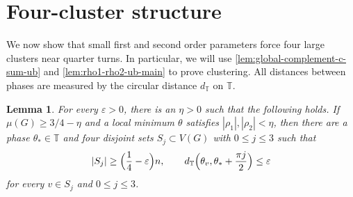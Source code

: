 \documentclass[reqno,11pt]{amsart}
\newtheorem{lemma}{Lemma}
\theoremstyle{definition}
\newcommand{\T}{\mathbb{T}}
\newcommand{\abs}[1]{\left\lvert #1\right\rvert}
\newcommand{\distT}{d_{\T}}
\begin{document}
\section{Four-cluster structure}\label{sec:four-clusters}

We now show that small first and second order parameters force four large
clusters near quarter turns.  In particular, we will use \cref{lem:global-complement-c-sum-ub} and  
\cref{lem:rho1-rho2-ub-main} to prove clustering. All distances between phases are measured by
the circular distance $\distT$ on $\T$.

\begin{lemma}\label{lem:clustering-part-1}
For every $\varepsilon>0$, there is an $\eta>0$ such that the following
holds.  If $\mu(G)\ge3/4-\eta$ and a local minimum $\theta$ satisfies
$\abs{\rho_1},\abs{\rho_2}<\eta$, then there are a phase
$\theta_*\in\T$ and four disjoint sets $S_j\subset V(G)$ with $0\le j \le 3$  such that
\[
    \abs{S_j}\ge\Bigl({\frac14-\varepsilon}\Bigr)n,
    \qquad
    \distT\Bigl({\theta_v,\theta_*+\frac{\pi j}{2}\Bigr)}
    \le\varepsilon
\]
for every $v\in S_j$ and $0\le j\le3$.
\end{lemma}
\end{document}
